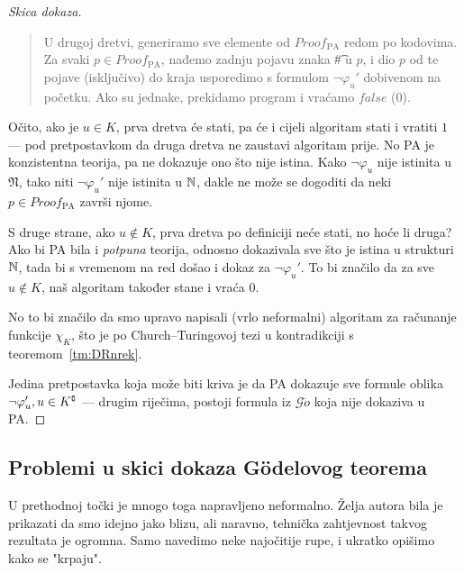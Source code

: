 \begin{proof}[Skica dokaza]
\begin{quote}
    U drugoj dretvi, generiramo sve elemente od $Proof_{\text{PA}}$ redom po kodovima. Za svaki $p\in Proof_{\text{PA}}$, nađemo zadnju pojavu znaka \t\# u $p$, i dio $p$ od te pojave (isključivo) do kraja usporedimo s formulom $\neg\varphi_u'$ dobivenom na početku. Ako su jednake, prekidamo program i vraćamo $\mathit{false}$ ($0$).
\end{quote}

Očito, ako je $u\in K$, prva dretva će stati, pa će i cijeli algoritam stati i vratiti $1$ --- pod pretpostavkom da druga dretva ne zaustavi algoritam prije. No PA je konzistentna teorija, pa ne dokazuje ono što nije istina. Kako $\neg\varphi_u$ nije istinita u $\mathfrak N$, tako niti $\neg\varphi_u'$ nije istinita u ${\mathbb N}$, dakle ne može se dogoditi da neki $p\in Proof_{\text{PA}}$ završi njome.

S druge strane, ako $u\not\in K$, prva dretva po definiciji neće stati, no hoće li druga? Ako bi PA bila i \emph{potpuna} teorija, odnosno dokazivala sve što je istina u strukturi ${\mathbb N}$, tada bi s vremenom na red došao i dokaz za $\neg\varphi_u'$. To bi značilo da za sve $u\not\in K$, naš algoritam također stane i vraća $0$.

No to bi značilo da smo upravo napisali (vrlo neformalni) algoritam za računanje funkcije $\chi_{K}$, što je po Church--\!Turingovoj tezi u kontradikciji s teoremom~\ref{tm:DRnrek}.

Jedina pretpostavka koja može biti kriva je da PA dokazuje sve formule oblika $\neg\varphi_u', u\in K\sp{{\scriptscriptstyle\complement}}$ --- drugim riječima, postoji formula iz $\mathcal G\ddot o$ koja nije dokaziva u PA.
\end{proof}

\subsection{Problemi u skici dokaza G\"odelovog teorema}

U prethodnoj točki je mnogo toga napravljeno neformalno. Želja autora bila je prikazati da smo idejno jako blizu, ali naravno, tehnička zahtjevnost takvog rezultata je ogromna. Samo navedimo neke najočitije rupe, i ukratko opišimo kako se "krpaju".

